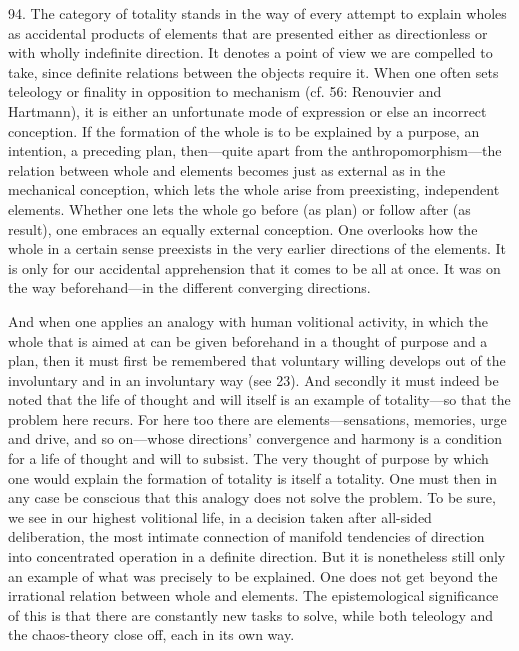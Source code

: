 \documentclass[12pt,a4paper]{book}
\newcommand{\opage}[1]{\marginnote{\footnotesize\textit{[#1]}}}
\begin{document}
94. The category of totality stands in the way of every attempt to explain
wholes as accidental products of elements that are presented either as
directionless or with wholly indefinite direction. It denotes a point of view
we are compelled to take, since definite relations between the objects require
it. When one often sets teleology or finality in opposition to mechanism (cf.
56: Renouvier and Hartmann), it is either an unfortunate mode of expression or
else an incorrect conception. If the formation of the whole is to be explained
by a purpose, an intention, a preceding plan, then---quite apart from the
anthropomorphism---the relation between whole and elements becomes just as
external as in the mechanical conception, which lets the whole arise from
preexisting, independent elements. Whether one lets the whole go before (as
plan) or follow after (as result), one embraces an equally external
conception. One overlooks how the whole in a certain sense preexists in the
very earlier directions of the elements. It is only for our accidental
apprehension that it \opage{222}comes to be all at once. It was on the way
beforehand---in the different converging directions.

And when one applies an analogy with human volitional activity, in which the
whole that is aimed at can be given beforehand in a thought of purpose and a
plan, then it must first be remembered that voluntary willing develops out of
the involuntary and in an involuntary way (see 23). And secondly it must
indeed be noted that the life of thought and will itself is an example of
totality---so that the problem here recurs. For here too there are
elements---sensations, memories, urge and drive, and so on---whose directions'
convergence and harmony is a condition for a life of thought and will to
subsist. The very thought of purpose by which one would explain the formation
of totality is itself a totality. One must then in any case be conscious that
this analogy does not solve the problem. To be sure, we see in our highest
volitional life, in a decision taken after all-sided deliberation, the most
intimate connection of manifold tendencies of direction into concentrated
operation in a definite direction. But it is nonetheless still only an example
of what was precisely to be explained. One does not get beyond the irrational
relation between whole and elements. The epistemological significance of this
is that there are constantly new tasks to solve, while both teleology and the
chaos-theory close off, each in its own way.
\end{document}
